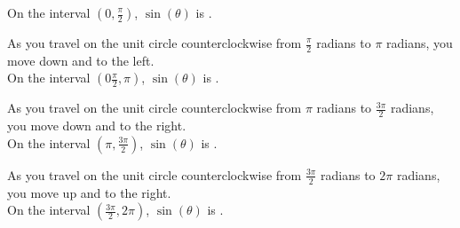 \documentclass{ximera}
\begin{document}
\begin{example}
\begin{question}
On the interval $\left (0, \frac{\pi}{2} \right)$, $\sin(\theta)$ is . \\

\end{question}







\begin{question}


As you travel on the unit circle counterclockwise from $\frac{\pi}{2}$ radians to $\pi$ radians, you move down and to the left. \\


On the interval $\left (0\frac{\pi}{2}, \pi \right)$, $\sin(\theta)$ is . \\

\end{question}







\begin{question}


As you travel on the unit circle counterclockwise from $\pi$ radians to $\frac{3\pi}{2}$ radians, you move down and to the right. \\


On the interval $\left (\pi, \frac{3\pi}{2} \right)$, $\sin(\theta)$ is . \\

\end{question}








\begin{question}


As you travel on the unit circle counterclockwise from $\frac{3\pi}{2}$ radians to $2\pi$ radians, you move up and to the right. \\


On the interval $\left (\frac{3\pi}{2}, 2\pi \right)$, $\sin(\theta)$ is . \\

\end{question}




















\end{example}
\end{document}

